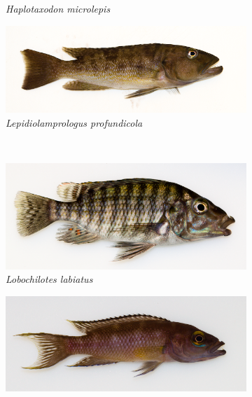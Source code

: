 \begin{figure}
\begin{subfigure}[t]{\fishfigwidth}
        \small
        \caption{\textit{Haplotaxodon microlepis}}
    \end{subfigure}
    \begin{subfigure}[t]{\fishfigwidth}
        \includegraphics[width=\fishfigwidth]{FishPoo/figures/host_phenotypes/Lepidiolamprologus_profundicola}
        \small
        \caption{\textit{Lepidiolamprologus profundicola}} 
    \end{subfigure} \\
    \begin{subfigure}[t]{\fishfigwidth}
        \includegraphics[width=\fishfigwidth]{FishPoo/figures/host_phenotypes/Lobochilotes_labiatus}
        \small
        \caption{\textit{Lobochilotes labiatus}}
    \end{subfigure}
    \begin{subfigure}[t]{\fishfigwidth}
        \includegraphics[width=\fishfigwidth]{FishPoo/figures/host_phenotypes/Neolamprologus_buescheri}
        \small

\end{subfigure}
\end{figure}
